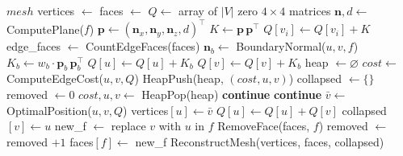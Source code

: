\begin{algorithm}
\caption{Mesh Decimation via QEM}
\label{alg:mesh_decimation_qem}
\begin{algorithmic}[1]
        \State \Return $mesh$
    \EndIf
    \State vertices $\gets$ 
    \State faces $\gets$ 
    \State $Q \gets$ array of $|V|$ zero $4 \times 4$ matrices
    \State {}
        \State $\mathbf{n}, d \gets$ ComputePlane($f$)
        \State $\mathbf{p} \gets (\mathbf{n}_x, \mathbf{n}_y, \mathbf{n}_z, d)^\top$
        \State $K \gets \mathbf{p} \, \mathbf{p}^\top$
            \State $Q[v_i] \gets Q[v_i] + K$
        \EndFor
    \EndFor
    \State {}
    \State edge\_faces $\gets$ CountEdgeFaces(faces)
        \State $\mathbf{n}_b \gets$ BoundaryNormal($u, v, f$)
        \State $K_b \gets w_b \cdot \mathbf{p}_b \, \mathbf{p}_b^\top$
        \State $Q[u] \gets Q[u] + K_b$
        \State $Q[v] \gets Q[v] + K_b$
    \EndFor
    \State {}
    \State heap $\gets \varnothing$ 
        \State $cost \gets$ ComputeEdgeCost($u, v, Q$)
        \State HeapPush(heap, $(cost, u, v)$)
    \EndFor
    \State {}
    \State collapsed $\gets \{\}$
    \State removed $\gets 0$
        \State $cost, u, v \gets$ HeapPop(heap)
            \State \textbf{continue}
        \EndIf
            \State \textbf{continue} 
        \EndIf
        \State $\bar{v} \gets$ OptimalPosition($u, v, Q$)
        \State vertices$[u] \gets \bar{v}$
        \State $Q[u] \gets Q[u] + Q[v]$
        \State collapsed$[v] \gets u$
            \State new\_f $\gets$ replace $v$ with $u$ in $f$
                \State RemoveFace(faces, $f$)
                \State removed $\gets$ removed $+ 1$
            \Else
                \State faces$[f] \gets$ new\_f
            \EndIf
        \EndFor
    \EndWhile
    \State \Return ReconstructMesh(vertices, faces, collapsed)
\EndFunction
\end{algorithmic}
\end{algorithm}

